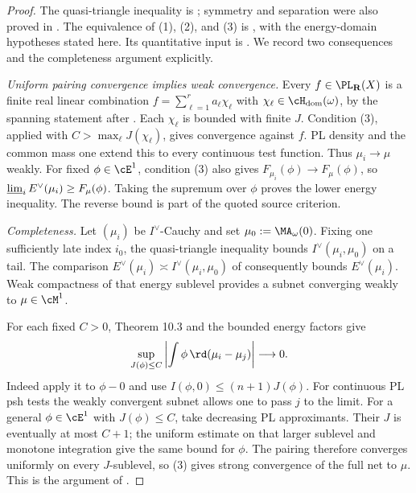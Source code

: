 \begin{proof}
The quasi-triangle inequality is \cite[Theorem~10.2]{BJ22}; symmetry
and separation were also proved in .
The equivalence of (1), (2), and (3) is
\cite[Theorem~10.12]{BJ22}, with the energy-domain hypotheses stated
here. Its quantitative input is \cite[Theorem~10.3]{BJ22}.
We record two consequences and the completeness argument explicitly.

\emph{Uniform pairing convergence implies weak convergence.}
Every $f\in\PL_{\mathbf R}(X)$ is a finite real linear combination
$f=\sum_{\ell=1}^r a_\ell\chi_\ell$ with
$\chi_\ell\in\cH_{\mathrm{dom}}(\omega)$, by the spanning statement
after . Each $\chi_\ell$ is bounded with finite $J$.
Condition (3), applied with $C>\max_\ell J(\chi_\ell)$, gives convergence
against $f$. PL density and the common mass one extend this to every
continuous test function. Thus $\mu_i\to\mu$ weakly.
For fixed $\phi\in\cE^1$, condition (3) also gives
$F_{\mu_i}(\phi)\to F_\mu(\phi)$, so
$\varliminf_i E^\vee(\mu_i)\ge F_\mu(\phi)$.
Taking the supremum over $\phi$ proves the lower energy inequality.
The reverse bound is part of the quoted source criterion.

\emph{Completeness.} Let $(\mu_i)$ be $I^\vee$-Cauchy and set
$\mu_0:=\MA_\omega(0)$. Fixing one sufficiently late index $i_0$,
the quasi-triangle inequality bounds $I^\vee(\mu_i,\mu_0)$ on a tail.
The comparison
$E^\vee(\mu_i)\asymp I^\vee(\mu_i,\mu_0)$ of
\cite[Theorem~10.2, equation~(10.1)]{BJ22} consequently bounds
$E^\vee(\mu_i)$. Weak compactness of that energy sublevel provides a
subnet converging weakly to $\mu\in\cM^1$.

For each fixed $C>0$, Theorem 10.3 and the bounded energy factors give
\[
 \sup_{J(\phi)\le C}
       \left|\int\phi\,\rd(\mu_i-\mu_j)\right|\longrightarrow0.
\]
Indeed apply it to $\phi-0$ and use
$I(\phi,0)\le(n+1)J(\phi)$.
For continuous PL psh tests the weakly convergent subnet allows one
to pass $j$ to the limit. For a general $\phi\in\cE^1$ with $J(\phi)\le C$,
take decreasing PL approximants. Their $J$ is eventually at most $C+1$;
the uniform estimate on that larger sublevel and monotone integration
give the same bound for $\phi$. The pairing therefore converges
uniformly on every $J$-sublevel, so (3) gives strong convergence of
the full net to $\mu$. This is the argument of
\cite[Theorem~10.14]{BJ22}.
\end{proof}

